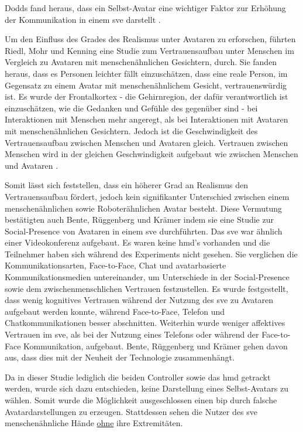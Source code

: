 \documentclass[a4paper,11pt]{article}%
\renewcommand{\\}{\vspace*{0.5\baselineskip} \newline}
\begin{document}
Dodds fand heraus, dass ein Selbst-Avatar eine wichtiger Faktor zur Erhöhung der Kommunikation in einem \ac{sve} darstellt \citep[1-11]{dodds2011talk}.

Um den Einfluss des Grades des Realismus unter Avataren zu erforschen, führten Riedl, Mohr und Kenning \cite{riedl2014trusting} eine Studie zum Vertrauensaufbau unter Menschen im Vergleich zu Avataren mit menschenähnlichen Gesichtern, durch. Sie fanden heraus, dass es Personen leichter fällt einzuschätzen, dass eine reale Person, im Gegensatz zu einem Avatar mit menschenähnlichem Gesicht, vertrauenswürdig ist. Es wurde der Frontalkortex - die Gehirnregion, der dafür verantwortlich ist einzuschätzen, wie die Gedanken und Gefühle des gegenüber sind - bei Interaktionen mit Menschen mehr angeregt, als bei Interaktionen mit Avataren mit menschenähnlichen Gesichtern.
Jedoch ist die Geschwindigkeit des Vertrauensaufbau zwischen Menschen und Avataren gleich. Vertrauen zwischen Menschen wird in der gleichen Geschwindigkeit aufgebaut wie zwischen Menschen und Avataren \cite{riedl2014trusting}.

Somit lässt sich feststellen, dass ein höherer Grad an Realismus den Vertrauensaufbau fördert, jedoch kein signifikanter Unterschied zwischen einem menschenähnlichen sowie Roboterähnlichen Avatar besteht. Diese Vermutung bestätigten auch Bente, Rüggenberg und Krämer \citep[p.54-59]{bente2004social} indem sie eine Studie zur Social-Presence von Avataren in einem \ac{sve} durchführten. Das \ac{sve} war ähnlich einer Videokonferenz aufgebaut. Es waren keine \ac{hmd}'s vorhanden und die Teilnehmer haben sich während des Experiments nicht gesehen. Sie verglichen die Kommunikationsarten, Face-to-Face, Chat und avatarbasierte Kommunikationsmedien untereinander, um Unterschiede in der Social-Presence sowie dem zwischenmenschlichen Vertrauen festzustellen.
Es wurde festgestellt, dass wenig kognitives Vertrauen während der Nutzung des \ac{sve} zu Avataren aufgebaut werden konnte, während Face-to-Face, Telefon und Chatkommunikationen besser abschnitten. Weiterhin wurde weniger affektives Vertrauen im \ac{sve}, als bei der Nutzung eines Telefons oder während der Face-to-Face Kommunikation, aufgebaut.
Bente, Rüggenberg und Krämer \citep[p.54-59]{bente2004social} gehen davon aus, dass dies mit der Neuheit der Technologie zusammenhängt.

Da in dieser Studie lediglich die beiden Controller sowie das \ac{hmd} getrackt werden, wurde sich dazu entschieden, keine Darstellung eines Selbst-Avatars zu wählen. Somit wurde die Möglichkeit ausgeschlossen einen \ac{bip} durch falsche Avatardarstellungen zu erzeugen. Stattdessen sehen die Nutzer des \ac{sve} menschenähnliche Hände \underline{ohne} ihre Extremitäten.
\end{document}
